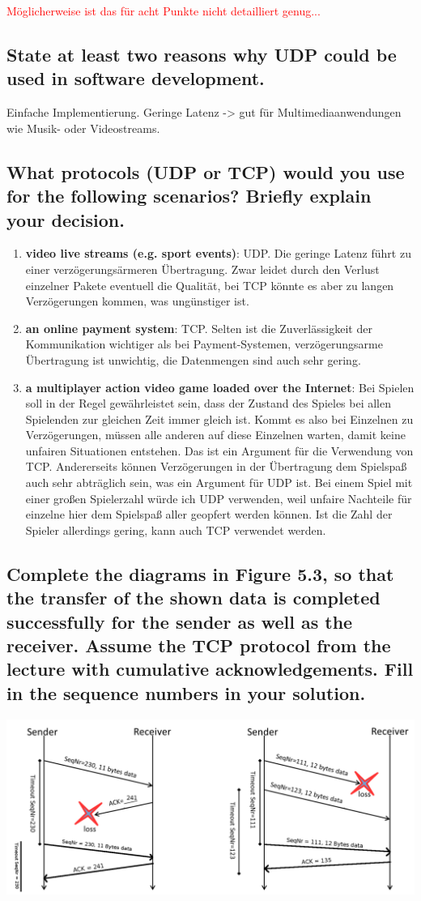 \documentclass[a4paper,
			llpt,
			solution,
			accentcolor=tud2d,
			colorbacktitle
			]
			{tudexercise}
\begin{document}
\textcolor{red}{Möglicherweise ist das für acht Punkte nicht detailliert genug...}
\subsection{State at least two reasons why UDP could be used in software development.}
Einfache Implementierung. Geringe Latenz -> gut für Multimediaanwendungen wie Musik- oder Videostreams.
\subsection{What protocols (UDP or TCP) would you use for the following scenarios? Briefly explain your decision.}
\begin{enumerate}
\item \textbf{video live streams (e.g. sport events)}: UDP. Die geringe Latenz führt zu einer verzögerungsärmeren Übertragung. Zwar leidet durch den Verlust einzelner Pakete eventuell die Qualität, bei TCP könnte es aber zu langen Verzögerungen kommen, was ungünstiger ist.
\item \textbf{an online payment system}: TCP. Selten ist die Zuverlässigkeit der Kommunikation wichtiger als bei Payment-Systemen, verzögerungsarme Übertragung ist unwichtig, die Datenmengen sind auch sehr gering.
\item \textbf{a multiplayer action video game loaded over the Internet}: Bei Spielen soll in der Regel gewährleistet sein, dass der Zustand des Spieles bei allen Spielenden zur gleichen Zeit immer gleich ist. Kommt es also bei Einzelnen zu Verzögerungen, müssen alle anderen auf diese Einzelnen warten, damit keine unfairen Situationen entstehen. Das ist ein Argument für die Verwendung von TCP. Andererseits können Verzögerungen in der Übertragung dem Spielspaß auch sehr abträglich sein, was ein Argument für UDP ist. Bei einem Spiel mit einer großen Spielerzahl würde ich UDP verwenden, weil unfaire Nachteile für einzelne hier dem Spielspaß aller geopfert werden können. Ist die Zahl der Spieler allerdings gering, kann auch TCP verwendet werden.
\end{enumerate}
\subsection{Complete the diagrams in Figure 5.3, so that the transfer of the shown data is completed successfully for the sender as well as the receiver. Assume the TCP protocol from the lecture with cumulative acknowledgements. Fill in the sequence numbers in your solution.}
\includegraphics[width=\textwidth]{haesslon.png}
\end{document}
